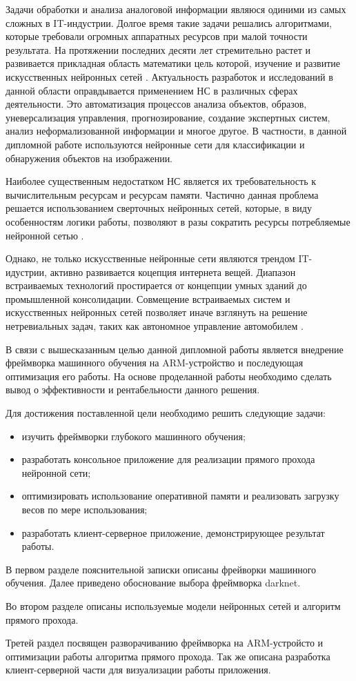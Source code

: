 \documentclass[a4paper,english,russian]{G2-105}
\begin{document}
 \ttl
\par Задачи обработки и анализа аналоговой информации являюся одиними из самых сложных в IT-индустрии. Долгое
время такие задачи решались алгоритмами, которые требовали огромных аппаратных ресурсов при малой точности результата. На протяжении последних десяти лет стремительно растет и развивается прикладная область математики цель которой, изучение и развитие искусственных нейронных сетей \cite{1}. Актуальность разработок и исследований в данной области оправдывается применением НС в различных сферах деятельности. Это автоматизация процессов анализа объектов, образов, уневерсализация управления, прогнозирование, создание экспертных систем, анализ неформализованной информации и многое другое. В частности, в данной дипломной работе используются нейронные сети для классификации и обнаружения объектов на изображении. 
\par Наиболее существенным недостатком НС является их требовательность к вычислительным ресурсам и ресурсам памяти. Частично данная проблема решается использованием сверточных нейронных сетей, которые, в виду особенностям логики работы, позволяют в разы сократить ресурсы потребляемые нейронной сетью \cite{2}.
\par Однако, не только искусственные нейронные сети являются трендом IT-идустрии, активно развивается коцепция интернета вещей. Диапазон встраиваемых технологий простирается от концепции умных зданий до промышленной консолидации. Совмещение встраиваемых систем и искусственных нейронных сетей позволяет иначе взглянуть на решение нетревиальных задач, таких как автономное управление автомобилем \cite{3}.
\par В связи с вышесказанным целью данной дипломной работы является внедрение фреймворка машинного обучения на ARM-устройство и последующая оптимизация его работы. На основе проделанной работы необходимо сделать вывод о эффективности и рентабельности данного решения. 
\par Для достижения поставленной цели необходимо решить следующие задачи:
\begin{itemize}
\item изучить фреймворки глубокого машинного обучения;
\item разработать консольное приложение для реализации прямого прохода нейронной сети;
\item оптимизировать использование оперативной памяти и реализовать загрузку весов по мере использования;
\item разработать клиент-серверное приложение, демонстрирующее результат работы.
\end{itemize}
\par В первом разделе пояснительной записки описаны фрейворки машинного обучения. Далее приведено обоснование выбора фреймворка darknet.
\par Во втором разделе описаны используемые модели нейронных сетей и алгоритм прямого прохода.
\par Третей раздел посвящен разворачиванию фреймворка на ARM-устройсто и оптимизации работы алгоритма прямого прохода. Так же описана разработка клиент-серверной части для визуализации работы приложения. 
\newpage
\end{document}
